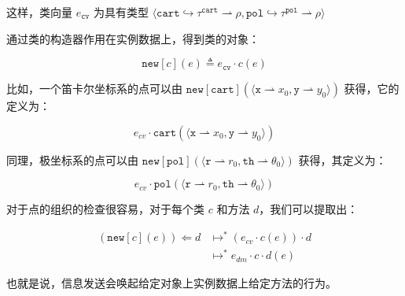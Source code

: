 这样，类向量 $e_{\mathtt{cv}}$ 为具有类型 $ \langle {\mathtt{cart}} \hookrightarrow \tau^{\mathtt{cart}} \rightharpoonup \rho, {\mathtt{pol}} \hookrightarrow \tau^{\mathtt{pol}} \rightharpoonup \rho \rangle$

通过类的构造器作用在实例数据上，得到类的对象：

$$ {\mathtt{new}}[c](e) \triangleq e_{\mathtt{cv}} \cdot c(e) $$

比如，一个笛卡尔坐标系的点可以由 $ {\mathtt{new}}[{\mathtt{cart}}](\langle {\mathtt{x}} \rightharpoonup x_{0}, {\mathtt{y}} \rightharpoonup y_{0} \rangle) $ 获得，它的定义为：

$$ e_{cv} \cdot {\mathtt{cart}}(\langle {\mathtt{x}} \rightharpoonup x_{0}, {\mathtt{y}} \rightharpoonup y_{0}\rangle) $$

同理，极坐标系的点可以由 ${\mathtt{new}}[{\mathtt{pol}}](\langle {\mathtt{r}} \rightharpoonup r_{0}, {\mathtt{th}} \rightharpoonup \theta_{0} \rangle) $ 获得，其定义为：

$$ e_{cv} \cdot {\mathtt{pol}}(\langle {\mathtt{r}} \rightharpoonup r_{0}, {\mathtt{th}} \rightharpoonup \theta_{0}\rangle) $$

对于点的组织的检查很容易，对于每个类 $c$ 和方法 $d$，我们可以提取出：

$$
\begin{aligned}
 ({\mathtt{new}[c](e)}) \Leftarrow d & \longmapsto^{*} (e_{cv} \cdot c(e)) \cdot d \\ & \longmapsto^{*} e_{dm} \cdot c \cdot d(e)
\end{aligned}
 $$

也就是说，信息发送会唤起给定对象上实例数据上给定方法的行为。
